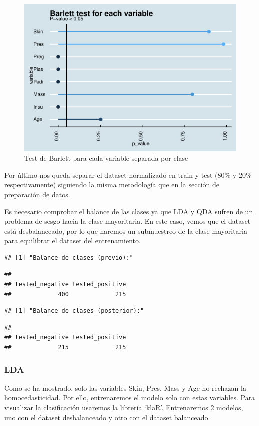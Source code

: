 \documentclass[
]{article}
\begin{document}
\begin{figure}

{\centering \includegraphics[width=0.5\linewidth]{pima-clasificacion_files/figure-latex/barlett-1} 

}

\caption{Test de Barlett para cada variable separada por clase}\label{fig:barlett}
\end{figure}

Por último nos queda separar el dataset normalizado en train y test
(80\% y 20\% respectivamente) siguiendo la misma metodología que en la
sección de preparación de datos.

Es necesario comprobar el balance de las clases ya que LDA y QDA sufren
de un problema de sesgo hacia la clase mayoritaria. En este caso, vemos
que el dataset está desbalanceado, por lo que haremos un submuestreo de
la clase mayoritaria para equilibrar el dataset del entrenamiento.

\begin{verbatim}
## [1] "Balance de clases (previo):"
\end{verbatim}

\begin{verbatim}
## 
## tested_negative tested_positive 
##             400             215
\end{verbatim}

\begin{verbatim}
## [1] "Balance de clases (posterior):"
\end{verbatim}

\begin{verbatim}
## 
## tested_negative tested_positive 
##             215             215
\end{verbatim}

\hypertarget{lda}{%
\subsubsection{LDA}\label{lda}}

Como se ha mostrado, solo las variables Skin, Pres, Mass y Age no
rechazan la homocedasticidad. Por ello, entrenaremos el modelo solo con
estas variables. Para visualizar la clasificación usaremos la librería
`klaR'. Entrenaremos 2 modelos, uno con el dataset desbalanceado y otro
con el dataset balanceado.
\end{document}
